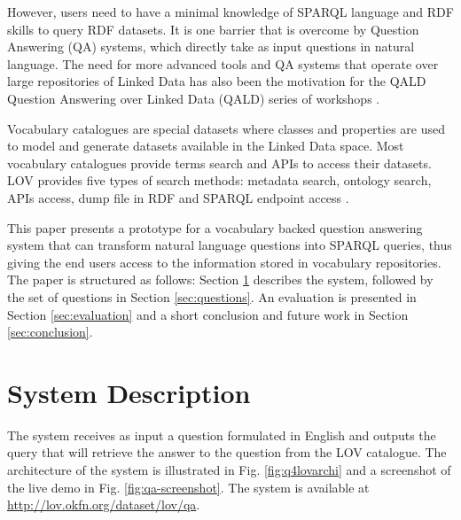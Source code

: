 \documentclass[runningheads,a4paper]{llncs}
\begin{document}
However, users need to have a minimal knowledge of SPARQL language and RDF skills to query  RDF datasets. It is one barrier that is overcome by Question Answering (QA) systems, which directly take as input questions in natural language. The need for more advanced tools and QA systems that operate over large repositories of Linked Data has also been the motivation for the QALD Question Answering over Linked Data (QALD) series of workshops \cite{lopezetal2013}. 
 
Vocabulary catalogues are special datasets where classes and properties are used to model and generate datasets available in the Linked Data space. Most vocabulary catalogues provide terms search and APIs to access their datasets. LOV provides five types of search methods: metadata search, ontology search, APIs access, dump file in RDF and SPARQL endpoint access \cite{vandenbusschelov}.


This paper presents a prototype for a vocabulary backed question answering system that can transform natural language questions into SPARQL queries, thus giving the end users access to the information stored in vocabulary repositories. The paper is structured as follows: Section \ref{sec:system} describes the system, followed by the set of questions in Section \ref{sec:questions}. An evaluation is presented in Section \ref{sec:evaluation} and a short conclusion and future work in Section \ref{sec:conclusion}.  

\vspace{1mm}

\section{System Description}
\label{sec:system}

The system receives as input a question formulated in English and outputs the query that will retrieve the answer to the question from the LOV catalogue. The architecture of the system is illustrated in Fig. \ref{fig:q4lovarchi} and a screenshot of the live demo in Fig. \ref{fig:qa-screenshot}. The system is available at \url{http://lov.okfn.org/dataset/lov/qa}.
\end{document}

